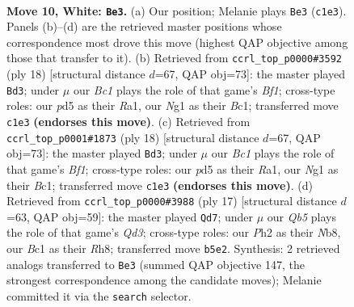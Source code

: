 \documentclass[11pt]{article}
\begin{document}
\clearpage

\begin{figure}[p]\centering
\begin{subfigure}{0.46\textwidth}\centering
\resizebox{\linewidth}{!}{%
\newchessgame
\chessboard[
  setfen={rnbq1k1r/pp2n1p1/4p3/1QPpPp1p/8/P1P5/2P2PPP/R1B1KBNR w KQ - 2 10},
  showmover=false,
  pgfstyle=straightmove, color=movearrow, markmove={c1-e3}
]}
\caption{}
\end{subfigure}\hfill
\begin{subfigure}{0.46\textwidth}\centering
\resizebox{\linewidth}{!}{%
\newchessgame
\chessboard[
  setfen={rnbqk2r/ppp2p2/4p1pp/3pP3/3P2Q1/2n5/P1P2PPP/R1B1KBNR w KQkq - 0 10},
  showmover=false,
  pgfstyle=straightmove, color=movearrow, markmove={f1-d3}
]}
\caption{}
\end{subfigure}
\\[4pt]
\begin{subfigure}{0.46\textwidth}\centering
\resizebox{\linewidth}{!}{%
\newchessgame
\chessboard[
  setfen={rnbqk2r/ppp2p2/4p1pp/3pP3/3P2Q1/2n5/P1P2PPP/R1B1KBNR w KQkq - 0 10},
  showmover=false,
  pgfstyle=straightmove, color=movearrow, markmove={f1-d3}
]}
\caption{}
\end{subfigure}\hfill
\begin{subfigure}{0.46\textwidth}\centering
\resizebox{\linewidth}{!}{%
\newchessgame
\chessboard[
  setfen={rn2kb1r/pp4pp/2pqpp2/8/3P4/2P5/PP2NPPP/R1BQK2R b KQkq - 1 9},
  showmover=false,
  pgfstyle=straightmove, color=movearrow, markmove={d6-d7}
]}
\caption{}
\end{subfigure}
\caption{\textbf{Move 10, White: \texttt{Be3}.} (a) Our position; Melanie plays \texttt{Be3} (\texttt{c1e3}). Panels (b)--(d) are the retrieved master positions whose correspondence most drove this move (highest QAP objective among those that transfer to it). (b) Retrieved from \texttt{ccrl\_top\_p0000\#3592} (ply 18) [structural distance $d$=67, QAP obj=73]: the master played \texttt{Bd3}; under $\mu$ our \emph{Bc1} plays the role of that game's \emph{Bf1}; cross-type roles: our \emph{p}d5 as their \emph{R}a1, our \emph{N}g1 as their \emph{B}c1; transferred move \texttt{c1e3} \textbf{(endorses this move)}. (c) Retrieved from \texttt{ccrl\_top\_p0001\#1873} (ply 18) [structural distance $d$=67, QAP obj=73]: the master played \texttt{Bd3}; under $\mu$ our \emph{Bc1} plays the role of that game's \emph{Bf1}; cross-type roles: our \emph{p}d5 as their \emph{R}a1, our \emph{N}g1 as their \emph{B}c1; transferred move \texttt{c1e3} \textbf{(endorses this move)}. (d) Retrieved from \texttt{ccrl\_top\_p0000\#3988} (ply 17) [structural distance $d$=63, QAP obj=59]: the master played \texttt{Qd7}; under $\mu$ our \emph{Qb5} plays the role of that game's \emph{Qd3}; cross-type roles: our \emph{P}h2 as their \emph{N}b8, our \emph{B}c1 as their \emph{R}h8; transferred move \texttt{b5e2}. Synthesis: 2 retrieved analogs transferred to \texttt{Be3} (summed QAP objective 147, the strongest correspondence among the candidate moves); Melanie committed it via the \texttt{search} selector.}
\label{fig:thought-m18}
\end{figure}
\end{document}

